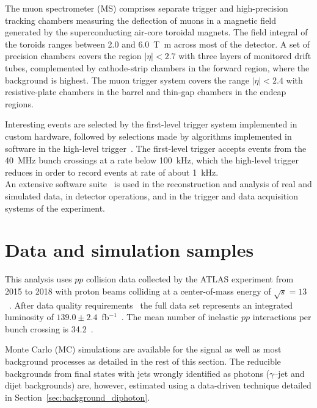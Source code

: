 \documentclass[PAPER, cernpreprint, texlive=2016, paper=a4, USenglish, texmf]{atlasdoc}
\begin{document}
The muon spectrometer (MS) comprises separate trigger and
high-precision tracking chambers measuring the deflection of muons in a magnetic field generated by the superconducting air-core toroidal magnets.
The field integral of the toroids ranges between \num{2.0} and \SI{6.0}{\tesla\metre}
across most of the detector.
A set of precision chambers covers the region \(|\eta| < 2.7\) with three layers of monitored drift tubes,
complemented by cathode-strip chambers in the forward region, where the background is highest.
The muon trigger system covers the range \(|\eta| < 2.4\) with resistive-plate chambers in the barrel and thin-gap chambers in the endcap regions.
 
Interesting events are selected by the first-level trigger system implemented in custom hardware,
followed by selections made by algorithms implemented in software in the high-level trigger~\cite{TRIG-2016-01}.
The first-level trigger accepts events from the \SI{40}{\MHz} bunch crossings at a rate below \SI{100}{\kHz},
which the high-level trigger reduces in order to record events at rate of about \SI{1}{\kHz}.\\
An extensive software suite~\cite{ATL-SOFT-PUB-2021-001} is used in the reconstruction and analysis of real
and simulated data, in detector operations, and in the trigger and data acquisition systems of the experiment.
 
 
 
\section{Data and simulation samples}
\label{sec:simulation}
 
This analysis uses $pp$ collision data collected by the ATLAS experiment from 2015 to 2018 with proton beams colliding at a center-of-mass energy of $\sqrt s =13$~\TeV.
After data quality requirements~\cite{DAPR-2018-01} the full data set represents an integrated luminosity of $139.0 \pm 2.4$~fb$^{-1}$~\cite{LUCID2,ATLAS-CONF-2019-021}.
The mean number of inelastic $pp$ interactions per bunch crossing is 34.2~\cite{priv-SIMU-2020-01}.
 
Monte Carlo (MC) simulations are available for the signal as well as most background processes as detailed in the rest of this section.
The reducible backgrounds from final states with jets wrongly identified as photons ($\gamma$--jet and dijet backgrounds) are, however, estimated using a data-driven technique detailed in Section~\ref{sec:background_diphoton}.
 
\end{document}
